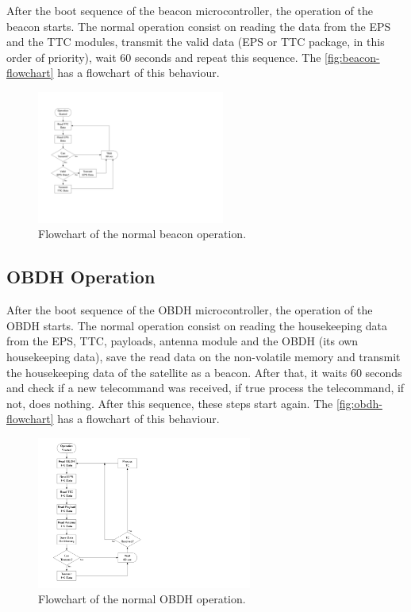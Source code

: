 After the boot sequence of the beacon microcontroller, the operation of the beacon starts. The normal operation consist on reading the data from the EPS and the TTC modules, transmit the valid data (EPS or TTC package, in this order of priority), wait 60 seconds and repeat this sequence. The \autoref{fig:beacon-flowchart} has a flowchart of this behaviour.

\begin{figure}[!ht]
    \begin{center}
        \includegraphics[width=0.55\textwidth]{figures/beacon-flowchart.pdf}
        \caption{Flowchart of the normal beacon operation.}
        \label{fig:beacon-flowchart}
    \end{center}
\end{figure}

\subsection{OBDH Operation}

After the boot sequence of the OBDH microcontroller, the operation of the OBDH starts. The normal operation consist on reading the housekeeping data from the EPS, TTC, payloads, antenna module and the OBDH (its own housekeeping data), save the read data on the non-volatile memory and transmit the housekeeping data of the satellite as a beacon. After that, it waits 60 seconds and check if a new telecommand was received, if true process the telecommand, if not, does nothing. After this sequence, these steps start again. The \autoref{fig:obdh-flowchart} has a flowchart of this behaviour.

\begin{figure}[!ht]
    \begin{center}
        \includegraphics[width=0.63\textwidth]{figures/obdh-flowchart.pdf}
        \caption{Flowchart of the normal OBDH operation.}
        \label{fig:obdh-flowchart}
    \end{center}
\end{figure}

